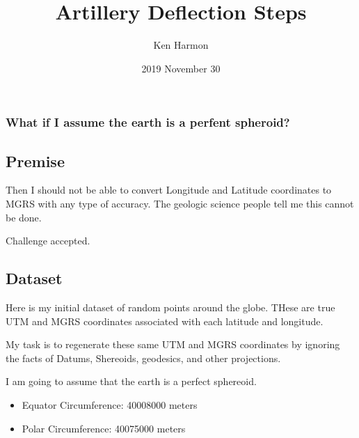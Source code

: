 \documentclass[
]{article}
\title{Artillery Deflection Steps}
\author{Ken Harmon}
\date{2019 November 30}
\providecommand{\tightlist}{%
  \setlength{\itemsep}{0pt}\setlength{\parskip}{0pt}}
\begin{document}
\maketitle

\hypertarget{section}{%
\section{}\label{section}}

\hypertarget{what-if-i-assume-the-earth-is-a-perfent-spheroid}{%
\subsubsection{What if I assume the earth is a perfent
spheroid?}\label{what-if-i-assume-the-earth-is-a-perfent-spheroid}}

\hypertarget{premise}{%
\subsection{Premise}\label{premise}}

Then I should not be able to convert Longitude and Latitude coordinates
to MGRS with any type of accuracy. The geologic science people tell me
this cannot be done.

Challenge accepted.

\hypertarget{dataset}{%
\subsection{Dataset}\label{dataset}}

Here is my initial dataset of random points around the globe. THese are
true UTM and MGRS coordinates associated with each latitude and
longitude.

My task is to regenerate these same UTM and MGRS coordinates by ignoring
the facts of Datums, Shereoids, geodesics, and other projections.

I am going to assume that the earth is a perfect sphereoid.

\begin{itemize}
\tightlist
\item
  Equator Circumference: 40008000 meters
\item
  Polar Circumference: 40075000 meters
\end{itemize}
\end{document}

